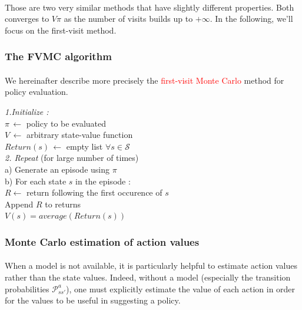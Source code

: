 \documentclass[a4paper]{article}
\begin{document}
{{{				\paragraph{} Those are two very similar methods that have slightly different properties. Both converges to $V\pi$ as the number of visits builds up to $+\infty$. In the following, we'll focus on the first-visit method. 
			}
			\subsubsection{The FVMC algorithm}
			{
				\paragraph{} We hereinafter describe more precisely the \textcolor{red}{first-visit Monte Carlo} method for policy evaluation. 
				\vspace{10pt}
				
				{
					\begin{algorithm}[H]
	 				\SetAlgoLined
					\LinesNumbered
					 \textsf{\emph{1.Initialize : }} \\
					 	\Indp\Indp$\pi \, \leftarrow$ policy to be evaluated  \\
						$V\, \leftarrow$ arbitrary state-value function \\
						$ Return(s) \, \leftarrow$  empty list $\forall s \in\mathcal{S}$\\
						\BlankLine
						\Indm\Indm
					\textsf{\emph{2. Repeat}} (for large number of times) \\
					\Indp \Indp a) Generate an episode using $\pi$ \\
						  	  b) For each state $s$ in the episode : \\
							  \Indp \Indp 
							  	$R \leftarrow $ return following the first occurence of $s$ \\
								Append $R$ to returns \\
								$V(s) = average(Return(s))$
				\end{algorithm}
				}
				
				\subsubsection{Monte Carlo estimation of action values}
				{
					\paragraph{} When a model is not available, it is particularly helpful to estimate action values rather than the state values. Indeed, without a model (especially the transition probabilities $\mathcal{P}_{ss'}^a$), one must explicitly estimate the value of each action in order for the values to be useful in suggesting a policy. 
					
}}}}
\end{document}

